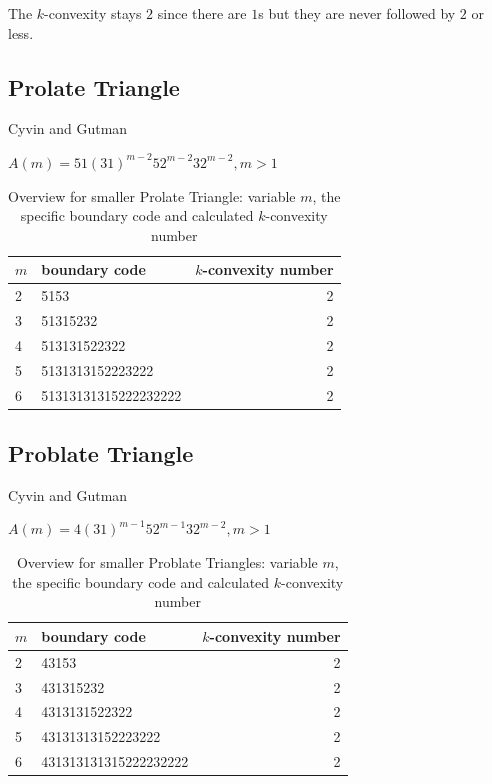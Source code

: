 \documentclass[a4paper,10pt]{article}
\begin{document}
{The $k$-convexity stays $2$ since there are $1$s but they are never followed by $2$
or less.


\subsection{Prolate Triangle}

Cyvin and Gutman~\cite[p.~197]{cyvin_1988}

\cite{cyvin_2013}


$A(m) = 51(31)^{m-2}52^{m-2}32^{m-2}, m>1$

\begin{table}
 \caption{Overview for smaller Prolate Triangle: variable $m$, the specific boundary code and calculated $k$-convexity number}
 \medskip
 \begin{tabular}{|l l r|}
 \hline
  $m$ & boundary code & $k$-convexity number\\
  \hline
  2 & 5153 & 2 \\
  3 & 51315232 & 2 \\
  4 & 513131522322 & 2 \\
  5 & 5131313152223222 & 2 \\
  6 & 51313131315222232222 & 2 \\
  \hline
 \end{tabular}
\end{table}


\subsection{Problate Triangle}

Cyvin and Gutman~\cite[p.~197]{cyvin_1988}


\cite{cyvin_2013}


$A(m) = 4(31)^{m-1} 52^{m-1}32^{m-2}, m>1$

\begin{table}
 \caption{Overview for smaller Problate Triangles: variable $m$, the specific boundary code and calculated $k$-convexity number}
 \medskip
 \begin{tabular}{|l l r|}
 \hline
  $m$ & boundary code & $k$-convexity number\\
  \hline
  2 & 43153 & 2 \\
  3 & 431315232 & 2 \\
  4 & 4313131522322 & 2 \\
  5 & 43131313152223222 & 2 \\
  6 & 431313131315222232222 & 2 \\
  \hline
 \end{tabular}
\end{table}

}
\end{document}
